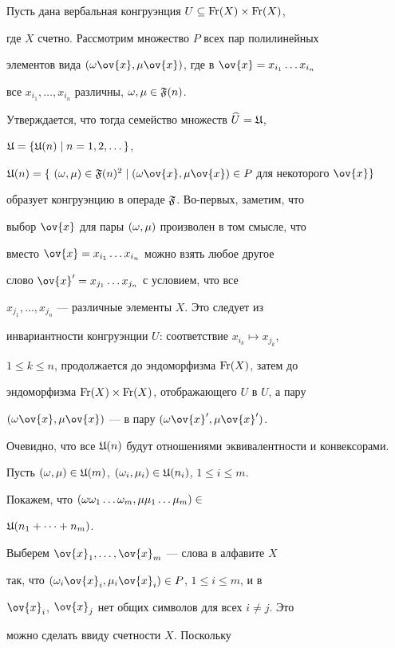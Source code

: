 \begin{pf}


Пусть дана вербальная конгруэнция $U\subseteq \operatorname{Fr}(X)\times \operatorname{Fr}(X)$,


где $X$ счетно. Рассмотрим множество $P$ всех пар полилинейных


элементов вида $(\o\ov{x}, \mu\ov{x})$, где в $\ov{x}=x_{i_1}\dotsc x_{i_n}$


все $x_{i_1},\dotsc, x_{i_n}$ различны, $\omega,\mu\in \frak F(n)$.


Утверждается, что тогда семейство множеств $\widehat{U}=\frak U$,


$\frak U=\{\frak U(n)\mid n=1,2, \dotsc\}$,


$\U(n)=\{\ (\o,\mu)\in \F(n)^2 \mid


(\o\ov{x}, \mu\ov{x})\in P$ для некоторого $\ov{x} \}$


образует конгруэнцию в операде $\frak F$. Во-первых, заметим, что


выбор $\ov{x}$ для пары $(\omega, \mu)$ произволен в том смысле, что


вместо $\ov{x}=x_{i_1}\dotsc x_{i_n}$ можно взять любое другое


слово $\ov{x}'=x_{j_1}\dotsc x_{j_n}$ с условием, что все


$x_{j_1},\dotsc, x_{j_n}$ --- различные элементы $X$. Это следует из


инвариантности конгруэнции $U$: соответствие $x_{i_k}\mapsto x_{j_k}$,


$1\le k\le n$, продолжается до эндоморфизма $\operatorname{Fr}(X)$, затем до


эндоморфизма $\operatorname{Fr}(X)\times \operatorname{Fr}(X)$, отображающего $U$ в $U$, а пару


$(\o\ov{x}, \mu\ov{x})$ --- в пару $(\o\ov{x}', \mu\ov{x}')$.


Очевидно, что все $\frak U(n)$ будут отношениями эквивалентности и конвексорами.


Пусть $(\omega,\mu)\in \frak U(m)$, $(\omega_i,\mu_i)\in\frak U(n_i)$, $1\le i\le m$.


Покажем, что $(\omega\omega_1\dotsc\omega_m, \mu\mu_1\dotsc\mu_m)\in$


$\frak U(n_1+\dotsb+n_m)$.


Выберем $\ov{x}_1,\dotsc,\ov{x}_m$ --- слова в алфавите $X$


так, что $(\o_i\ov{x}_i,\mu_i\ov{x}_i)\in P$, $1\le i\le m$, и в


$\ov{x}_i$, $\ov{x}_j$ нет общих символов для всех $i\ne j$. Это


можно сделать ввиду счетности $X$. Поскольку



\end{pf}
